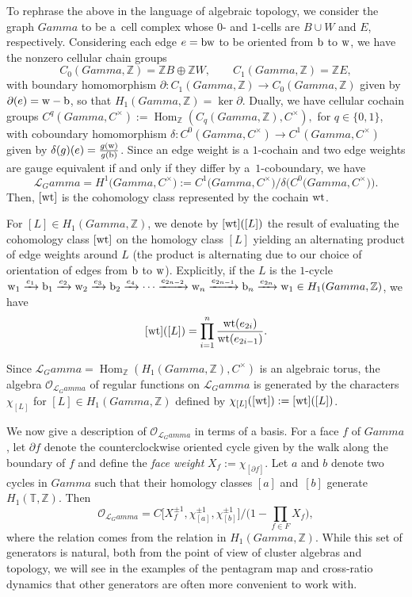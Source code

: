 \documentclass[10pt,a4paper]{amsart}
\numberwithin{equation}{section}
\newcommand{\Z}{{\mathbb Z}}
\newcommand{\C}{{\mathbb C}}
\newcommand{\T}{{\mathbb T}}
\newcommand{\ra}{\rightarrow}
\newcommand{\w}{{\rm w}}
\newcommand{\bw}{{\rm b}}
\newcommand{\wt}{{\rm wt}}
\DeclareMathOperator{\Hom}{Hom}
\def\Gamma{Gamma}
\def\C{C}
\begin{document}
	To rephrase the above in the language of algebraic topology, we consider the graph $\Gamma$ to be a~cell complex whose $0$- and $1$-cells are $B \cup W$ and $E$, respectively. Considering each edge $e={\rm b w}$ to be oriented from ${\rm b}$ to ${\rm w}$, we have the nonzero cellular chain groups
	\[
	C_0(\Gamma,\Z)=\Z B \oplus \Z W, \qquad C_1(\Gamma,\Z)=\Z E,
	\]
	with boundary homomorphism $\partial\colon C_1(\Gamma,\Z) \ra C_0(\Gamma,\Z)$ given by $\partial(e)={\rm w}-{\rm b}$, so that $H_1(\Gamma,\Z)= \ker \partial$. Dually, we have cellular cochain groups
	$
	C^q(\Gamma,\C^\times):= \Hom _\Z(C_q(\Gamma,\Z),\C^\times),
	$
	for $q \in \{0,1\}$, with coboundary homomorphism $\delta\colon C^0(\Gamma,\C^\times) \ra C^1(\Gamma,\C^\times)$ given by $\delta(g)(e)=\frac{g({\rm w})}{g({\rm b})}$.
	Since an edge weight is a $1$-cochain and two edge weights are gauge equivalent if and only if they differ by a~$1$-coboundary, we have
	\[
		\mathcal L_\Gamma=H^1\big(\Gamma,\C^\times\big):=C^1\big(\Gamma,\C^\times\big)/\delta\bigl(C^0\big(\Gamma,\C^\times\big)\bigr).
	\]
	{Then}, $[{\rm wt}]$ {is} the cohomology class represented by the cochain ${\rm wt}$.
	
	For $[L] \in H_1(\Gamma,\Z)$, we denote by ${[\rm wt]}([L])$ the result of evaluating the cohomology class $[{\rm wt}]$ on the homology class $[L]$ yielding an alternating product of edge weights around $L$ (the product is alternating due to our choice of orientation of edges from $\bw$ to $\w$). Explicitly, if the $L$ is the $1$-cycle ${\rm w}_1 \xrightarrow[]{e_1} {\rm b}_1 \xrightarrow[]{e_2} {\rm w}_2 \xrightarrow[]{e_3} {\rm b}_2 \xrightarrow[]{e_4} \cdots \xrightarrow[]{e_{2n-2}} {\rm w}_n \xrightarrow[]{e_{2n-1}} {\rm b}_n \xrightarrow[]{e_{2n}} {\rm w}_1 \in H_1(\Gamma,\Z)$, we have
	\[
	[{\rm wt}]([L])=\prod_{i=1}^n \frac{\wt(e_{2i})}{\wt(e_{2i-1})}.
	\]
	
	
	Since $\mathcal L_\Gamma=\Hom _\Z(H_1(\Gamma,\Z),\C^\times)$ is an algebraic torus, the algebra $\mathcal O_{\mathcal L_\Gamma}$ of regular functions on $\mathcal L_\Gamma$ is generated by the characters $\chi_{[L]}$ for $[L] \in H_1(\Gamma,\Z)$ defined by $\chi_{[L]}([{\rm wt}]):=[{\rm wt}]([L])$.
	
	We now give a description of $\mathcal O_{\mathcal L_\Gamma}$ in terms of a basis. For a face $f$ of $\Gamma$, let $\partial f$ denote the counterclockwise oriented cycle given by the walk along the boundary of $f$ and {define the \emph{face weight}} $X_f :=\chi_{[\partial f]}$. Let $a$ and $b$ denote two cycles in $\Gamma$ {such that their homology classes $[a]$ and~$[b]$ generate} $H_1(\T,\Z)$. Then
	\[
		\mathcal O_{\mathcal L_\Gamma}=\C\bigl[X_f^{\pm 1},\chi_{[a]}^{\pm 1},\chi_{[b]}^{\pm 1}\bigr]/\big(1-\mbox{$\prod_{f \in F}$} X_f\big),
	\]
	where the relation  comes from the relation  in $H_1(\Gamma,\Z)$. {While this set of generators is natural, both from the point of view of cluster algebras and topology, we will see in the examples of the pentagram map and cross-ratio dynamics that other generators are often more convenient to work with.}
	
\end{document}
